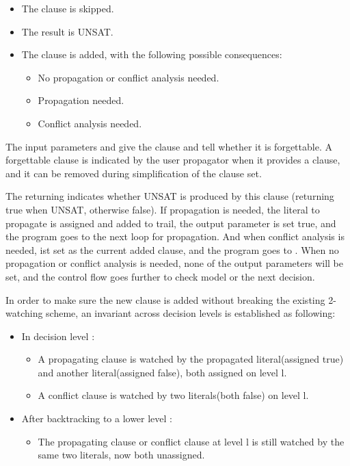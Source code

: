 \begin{itemize}
  \item The clause is skipped.
  \item The result is UNSAT.
  \item The clause is added, with the following possible consequences:
    \begin{itemize}
      \item No propagation or conflict analysis needed.
      \item Propagation needed.
      \item Conflict analysis needed.
    \end{itemize}
\end{itemize}

The input parameters  and  give the clause and tell whether it is forgettable. A forgettable clause is indicated by the user propagator when it provides a clause, and it can be removed during simplification of the clause set.

The returning  indicates whether UNSAT is produced by this clause (returning true when UNSAT, otherwise false). If propagation is needed, the literal to propagate is assigned and added to trail, the output parameter  is set true, and the program goes to the next loop for propagation. And when conflict analysis is needed,  ist set as the current added clause, and the program goes to . When no propagation or conflict analysis is needed, none of the output parameters will be set, and the control flow goes further to check model or the next decision.



In order to make sure the new clause is added without breaking the existing 2-watching scheme, an invariant across decision levels is established as following:

\begin{itemize}
  \item In decision level :
  \begin{itemize}
    \item A propagating clause is watched by the propagated literal(assigned true) and another literal(assigned false), both assigned on level l.
    \item A conflict clause is watched by two literals(both false) on level l.
  \end{itemize}
  \item After backtracking to a lower level :
  \begin{itemize}
    \item The propagating clause or conflict clause at level l is still watched by the same two literals, now both unassigned.
  \end{itemize}
\end{itemize}

